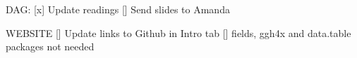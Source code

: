 DAG:
[x] Update readings
[] Send slides to Amanda

WEBSITE
[] Update links to Github in Intro tab
[] fields, ggh4x and data.table packages not needed